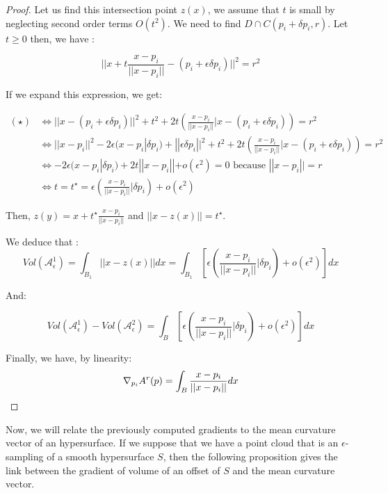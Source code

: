 \begin{proof}
Let us find this intersection point $ z(x) $, we assume that $ t $ is small by
neglecting second order terms $ O(t^2) $. We need to find $ D \cap C(p_i +
\delta p_i, r) $. Let $ t \ge 0 $ then, we have :

\begin{equation}
    || x + t \frac{x - p_i}{||x - p_i||} - (p_i + \epsilon \delta p_i) ||^2 = r^2
    \tag{$\star$}
\end{equation}

If we expand this expression, we get:

\begin{align*}
    (\star) & \iff || x - (p_i + \epsilon \delta p_i) ||^2 + t^2 + 2t \left(
        \frac{x-p_i}{|| x - p_i||} | x - (p_i + \epsilon \delta p_i) \right) = r^2 \\
    & \iff || x - p_i || ^2 - 2 \epsilon (x - p_i | \delta p_i) + || \epsilon \delta p_i || ^2 + t^2 + 2t
    \left( \frac{x-p_i}{|| x - p_i||} | x - (p_i + \epsilon \delta p_i) \right) = r^2 \\
    & \iff -2 \epsilon (x - p_i | \delta p_i) + 2t || x - p_i|| + o(\epsilon^2) = 0
    \text{ because } || x - p_i || = r \\
    & \iff t = t^{\star} = \epsilon \left( \frac{x - p_i}{||x - p_i||} | \delta p_i \right) +
    o(\epsilon^2)
\end{align*}

Then, $ z(y) = x + t^{\star} \frac{x - p_i}{||x - p_i||} $ and $ || x - z(x) || =
t^{\star} $.

We deduce that :
$$ Vol(\mathcal{A}^1_\epsilon) = \int_{B_1} || x - z(x) || dx = \int_{B_1}
\left[ \epsilon \left( \frac{x - p_i}{||x - p_i||} | \delta p_i \right) +
    o(\epsilon^2) \right] dx $$

And:

$$ Vol(\mathcal{A}^1_\epsilon) - Vol(\mathcal{A}^2_\epsilon) = \int_{B} \left[
    \epsilon \left( \frac{x - p_i}{||x - p_i||} | \delta p_i \right) +
    o(\epsilon^2) \right] dx $$

Finally, we have, by linearity:
\begin{equation*}
    \nabla_{p_i} A^r(p) = \int_{B} \frac{x - p_i}{||x - p_i||} dx \qedhere
\end{equation*}

\end{proof}

Now, we will relate the previously computed gradients to the mean curvature
vector of an hypersurface. If we suppose that we have a point cloud that is an
$\epsilon$-sampling of a smooth hypersurface $ S $, then the following
proposition gives the link between the gradient of volume of an offset of $ S $
and the mean curvature vector.

